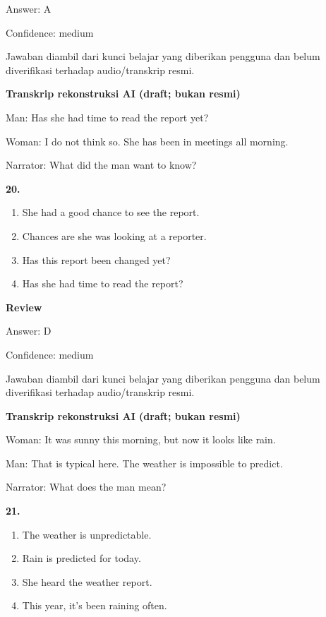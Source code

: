 \documentclass[12pt]{article}
\begin{document}
Answer: A\par
Confidence: medium\par
Jawaban diambil dari kunci belajar yang diberikan pengguna dan belum diverifikasi terhadap audio/transkrip resmi.\par
\endgroup
\par
\vspace{0.25\baselineskip}
\begin{exampleblock}
\textbf{Transkrip rekonstruksi AI (draft; bukan resmi)}\par
Man: Has she had time to read the report yet?\par
Woman: I do not think so. She has been in meetings all morning.\par
Narrator: What did the man want to know?\par
\end{exampleblock}
\noindent\textbf{20.}
\begin{enumerate}[label=(\Alph*),leftmargin=*,itemsep=0.2em]
\item She had a good chance to see the report.
\item Chances are she was looking at a reporter.
\item Has this report been changed yet?
\item Has she had time to read the report?
\end{enumerate}
\par
\begingroup
\setlength{\parskip}{0pt}
\setlength{\parindent}{0pt}
\textbf{Review}\par
Answer: D\par
Confidence: medium\par
Jawaban diambil dari kunci belajar yang diberikan pengguna dan belum diverifikasi terhadap audio/transkrip resmi.\par
\endgroup
\par
\vspace{0.25\baselineskip}
\begin{exampleblock}
\textbf{Transkrip rekonstruksi AI (draft; bukan resmi)}\par
Woman: It was sunny this morning, but now it looks like rain.\par
Man: That is typical here. The weather is impossible to predict.\par
Narrator: What does the man mean?\par
\end{exampleblock}
\noindent\textbf{21.}
\begin{enumerate}[label=(\Alph*),leftmargin=*,itemsep=0.2em]
\item The weather is unpredictable.
\item Rain is predicted for today.
\item She heard the weather report.
\item This year, it's been raining often.
\end{enumerate}
\end{document}
